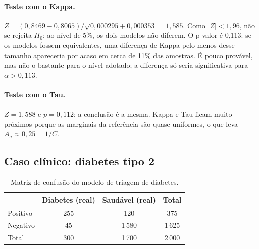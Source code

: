 \documentclass[12pt,a4paper]{article}
\begin{document}
\paragraph{Teste com o Kappa.} $Z = (0{,}8469 - 0{,}8065)/\sqrt{0{,}000295 + 0{,}000353} = 1{,}585$. Como $|Z| < 1{,}96$, não se rejeita $H_0$: ao nível de 5\%, os dois modelos não diferem. O p-valor é 0,113: se os modelos fossem equivalentes, uma diferença de Kappa pelo menos desse tamanho apareceria por acaso em cerca de 11\% das amostras. É pouco provável, mas não o bastante para o nível adotado; a diferença só seria significativa para $\alpha > 0{,}113$.

\paragraph{Teste com o Tau.} $Z = 1{,}588$ e $p = 0{,}112$; a conclusão é a mesma. Kappa e Tau ficam muito próximos porque as marginais da referência são quase uniformes, o que leva $A_a \approx 0{,}25 = 1/C$.

\subsection{Caso clínico: diabetes tipo 2}

\begin{table}[H]
\centering
\caption{Matriz de confusão do modelo de triagem de diabetes.}
\label{tab:diabetes}
\begin{tabular}{lccc}
\toprule
 & Diabetes (real) & Saudável (real) & Total \\
\midrule
Positivo & 255 & 120  & 375  \\
Negativo & 45  & 1\,580 & 1\,625 \\
Total    & 300 & 1\,700 & 2\,000 \\
\bottomrule
\end{tabular}
\end{table}
\end{document}
